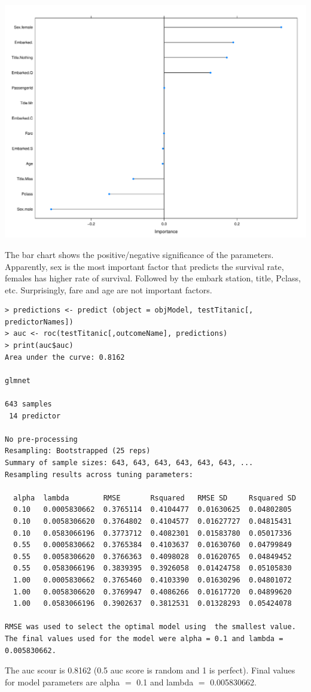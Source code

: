 \documentclass[11pt]{article}
\begin{document}
\centerline{\includegraphics[page=1,width=6.5 in]{Rplot02.pdf}}

The bar chart shows the positive/negative significance of the parameters. Apparently, sex is the most important factor that predicts the survival rate, females has higher rate of survival. Followed by the embark station, title, Pclass, etc. Surprisingly, fare and age are not important factors. 

\begin{verbatim}
> predictions <- predict (object = objModel, testTitanic[, predictorNames])
> auc <- roc(testTitanic[,outcomeName], predictions)
> print(auc$auc)
Area under the curve: 0.8162

glmnet 

643 samples
 14 predictor

No pre-processing
Resampling: Bootstrapped (25 reps) 
Summary of sample sizes: 643, 643, 643, 643, 643, 643, ... 
Resampling results across tuning parameters:

  alpha  lambda        RMSE       Rsquared   RMSE SD     Rsquared SD
  0.10   0.0005830662  0.3765114  0.4104477  0.01630625  0.04802805 
  0.10   0.0058306620  0.3764802  0.4104577  0.01627727  0.04815431 
  0.10   0.0583066196  0.3773712  0.4082301  0.01583780  0.05017336 
  0.55   0.0005830662  0.3765384  0.4103637  0.01630760  0.04799849 
  0.55   0.0058306620  0.3766363  0.4098028  0.01620765  0.04849452 
  0.55   0.0583066196  0.3839395  0.3926058  0.01424758  0.05105830 
  1.00   0.0005830662  0.3765460  0.4103390  0.01630296  0.04801072 
  1.00   0.0058306620  0.3769947  0.4086266  0.01617720  0.04899620 
  1.00   0.0583066196  0.3902637  0.3812531  0.01328293  0.05424078 

RMSE was used to select the optimal model using  the smallest value.
The final values used for the model were alpha = 0.1 and lambda = 0.005830662. 
\end{verbatim}
The auc scour is 0.8162 (0.5 auc score is random and 1 is perfect). Final values for model parameters  are alpha $=$ 0.1 and lambda $=$ 0.005830662. 
\end{document}
